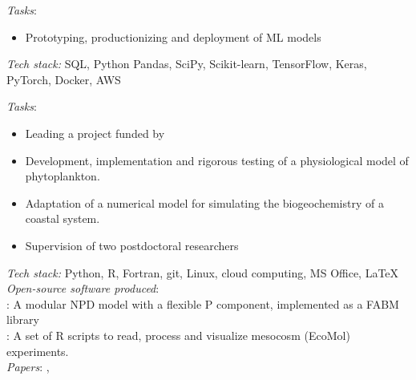 \documentclass[
	a4paper,
]{fortysecondscv}
\begin{document}
\begin{cvtable}[1.0]
    
	{\href{https://datascienceretreat.com}{\color{pblue}{Data Science Retreat, Germany}}}
	{\textit{Tasks}: 
    \begin{itemize}[topsep=0pt,itemsep=0pt,partopsep=0pt, parsep=0pt, leftmargin=*]
     \setlength\itemsep{1mm}
     \item Prototyping, productionizing and deployment of ML models
    \end{itemize}
    \textit{Tech stack:} SQL, Python Pandas, SciPy, Scikit-learn, TensorFlow, Keras, PyTorch, Docker, AWS
    }
    
	{\href{https://uol.de/en/icbm}{\color{pblue}{ICBM, University of Oldenburg, Germany}}}
	{\textit{Tasks}:
	\begin{itemize}[topsep=0pt,itemsep=0pt,partopsep=0pt, parsep=0pt, leftmargin=*]
     \item Leading a project funded by \href{https://www.dfg.de/en}{\color{blue}{DFG}}
     \item Development, implementation and rigorous testing of a physiological model of phytoplankton.%
     \item Adaptation of a numerical model for simulating the biogeochemistry of a coastal system.
     \item Supervision of two postdoctoral researchers
    \end{itemize}
      \textit{Tech stack:} Python, R, Fortran, git, Linux, cloud computing, MS Office, \LaTeX\\  
      \textit{Open-source software produced}:\\
      \href{https://github.com/OnurKerimoglu/fabm-nflexpd}{\color{pblue}{FABM-NflexPD}}: A modular NPD model with a flexible P component, implemented as a FABM library\\
      \href{https://github.com/OnurKerimoglu/R-EcoMol}{\color{pblue}{R-EcoMol}}: A set of R scripts to read, process and visualize mesocosm (EcoMol) experiments.\\
      \textit{Papers}:
      \href{https://doi.org/10.1016/j.ecolmodel.2020.109401}{\color{pblue}{1}}, %
}
\end{cvtable}
\end{document}
